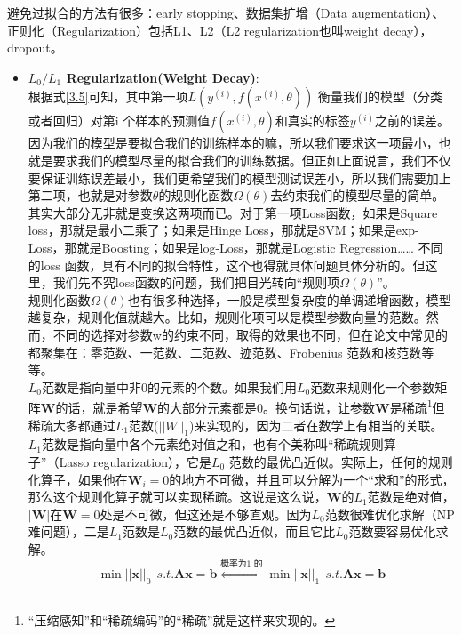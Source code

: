 \documentclass[11pt,fleqn, UTF8]{ctexbook} %
\begin{document}
避免过拟合的方法有很多：early stopping、数据集扩增（Data augmentation）、正则化（Regularization）包括L1、L2（L2 regularization也叫weight decay），dropout。

\begin{itemize}
  \item \textbf{$L_0/L_1$ Regularization(Weight Decay)}:\\
  根据式\ref{3.5}可知，其中第一项$L(y^{(i)},f(x^{(i)}, \theta))$ 衡量我们的模型（分类或者回归）对第i 个样本的预测值$f(x^{(i)}, \theta)$和真实的标签$y^{(i)}$之前的误差。因为我们的模型是要拟合我们的训练样本的嘛，所以我们要求这一项最小，也就是要求我们的模型尽量的拟合我们的训练数据。但正如上面说言，我们不仅要保证训练误差最小，我们更希望我们的模型测试误差小，所以我们需要加上第二项，也就是对参数$\theta$的规则化函数$\Omega(\theta)$去约束我们的模型尽量的简单。\\
  其实大部分无非就是变换这两项而已。对于第一项Loss函数，如果是Square loss，那就是最小二乘了；如果是Hinge Loss，那就是SVM；如果是exp-Loss，那就是Boosting；如果是log-Loss，那就是Logistic Regression…… 不同的loss 函数，具有不同的拟合特性，这个也得就具体问题具体分析的。但这里，我们先不究loss函数的问题，我们把目光转向“规则项$\Omega(\theta)$”。\\
  规则化函数$\Omega(\theta)$也有很多种选择，一般是模型复杂度的单调递增函数，模型越复杂，规则化值就越大。比如，规则化项可以是模型参数向量的范数。然而，不同的选择对参数w的约束不同，取得的效果也不同，但在论文中常见的都聚集在：零范数、一范数、二范数、迹范数、Frobenius 范数和核范数等等。\\
  $L_0$范数是指向量中非0的元素的个数。如果我们用$L_0$范数来规则化一个参数矩阵$\boldsymbol{W}$的话，就是希望$\boldsymbol{W}$的大部分元素都是0。换句话说，让参数$\boldsymbol{W}$是稀疏\footnote{“压缩感知”和“稀疏编码”的“稀疏”就是这样来实现的。}但稀疏大多都通过$L_1$范数($||W||_1$)来实现的，因为二者在数学上有相当的关联。\\
  $L_1$范数是指向量中各个元素绝对值之和，也有个美称叫“稀疏规则算子”（Lasso regularization），它是$L_0$ 范数的最优凸近似。实际上，任何的规则化算子，如果他在$\boldsymbol{W}_i=0$的地方不可微，并且可以分解为一个“求和”的形式，那么这个规则化算子就可以实现稀疏。这说是这么说，$\boldsymbol{W}$的$L_1$范数是绝对值，$|\boldsymbol{W}|$在$\boldsymbol{W}=0$处是不可微，但这还是不够直观。因为$L_0$范数很难优化求解（NP难问题），二是$L_1$范数是$L_0$范数的最优凸近似，而且它比$L_0$范数要容易优化求解。\\
  \begin{equation*}
    \min||\boldsymbol{x}||_0~~s.t. \boldsymbol{A}\boldsymbol{x}=\boldsymbol{b}\overset{\text{概率为1 的}}{\underset{}{\iff}}\min||\boldsymbol{x}||_1~~s.t. \boldsymbol{A}\boldsymbol{x}=\boldsymbol{b}

\end{equation*}
\end{itemize}
\end{document}
